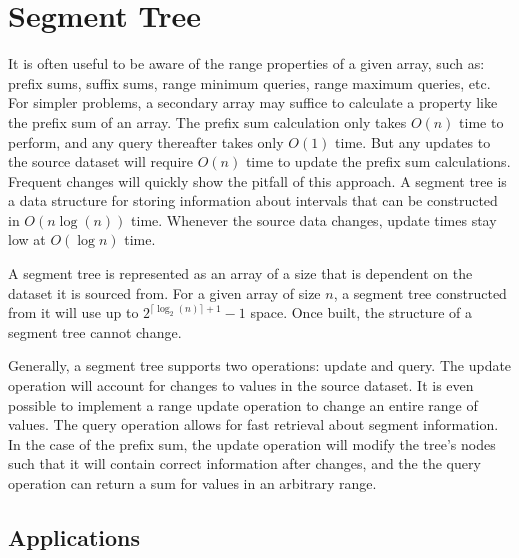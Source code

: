 \section{Segment Tree}


It is often useful to be aware of the range properties of a given array, such as: prefix sums, suffix sums, range minimum queries, range maximum queries, etc.
For simpler problems, a secondary array may suffice to calculate a property like the prefix sum of an array.
The prefix sum calculation only takes $O(n)$ time to perform, and any query thereafter takes only $O(1)$ time.
But any updates to the source dataset will require $O(n)$ time to update the prefix sum calculations.
Frequent changes will quickly show the pitfall of this approach.
A segment tree is a data structure for storing information about intervals that can be constructed in $O(n \log(n))$ time.
Whenever the source data changes, update times stay low at $O(\log n)$ time.


A segment tree is represented as an array of a size that is dependent on the dataset it is sourced from.
For a given array of size $n$, a segment tree constructed from it will use up to $2^{\lceil \log_2 (n)\rceil + 1} - 1$ space.
Once built, the structure of a segment tree cannot change.






Generally, a segment tree supports two operations: update and query.
The update operation will account for changes to values in the source dataset.
It is even possible to implement a range update operation to change an entire range of values.
The query operation allows for fast retrieval about segment information.
In the case of the prefix sum, the update operation will modify the tree's nodes such that it will contain correct information after changes, and the the query operation can return a sum for values in an arbitrary range.

\subsection{Applications}

